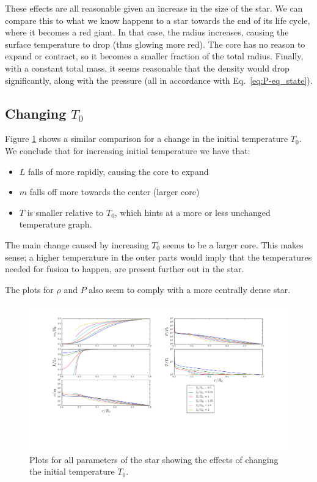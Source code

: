\documentclass[11pt,twocolumn]{article}
\begin{document}
These effects are all reasonable given an increase in the size of the
star. We can compare this to what we know happens to a star towards the
end of its life cycle, where it becomes a red giant. In that case, the
radius increases, causing the surface temperature to drop (thus
glowing more red). The core has no reason to expand or contract, so it
becomes a smaller fraction of the total radius. Finally, with a constant total mass, it seems reasonable
that the density would drop significantly, along with the pressure
(all in accordance with Eq.~\eqref{eq:P-eq_state}). 


\subsection{Changing $T_0$}
Figure \ref{fig:T-variation} shows a similar comparison for a change
in the initial temperature $T_0$. We conclude that for increasing
initial temperature we have that:

\begin{itemize}
  \item $L$ falls of more rapidly, causing the core to expand
  \item $m$ falls off more towards the center (larger core)
  \item $T$ is smaller relative to $T_0$, which hints at a more or
    less unchanged temperature graph.
\end{itemize}

The main change caused by increasing $T_0$ seems to be a larger
core. This makes sense; a higher temperature in the outer parts would
imply that the temperatures needed for fusion to happen, are present
further out in the star.

The plots for $\rho$ and $P$ also seem to comply with a more centrally
dense star.

\begin{figure}[ht]
  \centering
  \includegraphics[width=\linewidth]{fig/T_variation.png}
  \caption{\label{fig:T-variation} Plots for all parameters of the star
  showing the effects of changing the initial temperature $T_0$.}
\end{figure}
\end{document}
